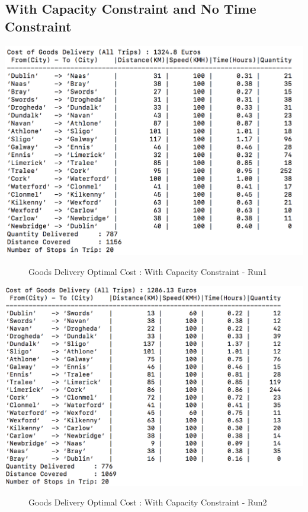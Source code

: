 \documentclass[a4paper&11pt]{article}
\begin{document}
\subsection*{With Capacity Constraint and No Time Constraint}

\begin{center}
\includegraphics[scale=0.8]{20fig1.png}
\begin{figure}[H]
\caption{Goods Delivery Optimal Cost :  With Capacity Constraint - Run1}
\end{figure}
\end{center}


\begin{center}
\includegraphics[scale=0.8]{20fig2.png}
\begin{figure}[H]
\caption{Goods Delivery Optimal Cost :  With Capacity Constraint - Run2}
\end{figure}
\end{center}
\end{document}

